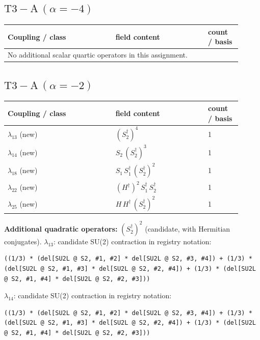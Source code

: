 \documentclass[9pt,a4paper]{article}
\begin{document}
\subsection*{$ \mathrm{T3-A}\,(\alpha=-4) $}
\begin{longtable}{@{}p{0.42\linewidth}p{0.36\linewidth}p{0.13\linewidth}@{}}
\toprule
Coupling / class & field content & count / basis\\
\midrule
\endhead
\multicolumn{3}{l}{No additional scalar quartic operators in this assignment.}\\
\bottomrule
\end{longtable}
\subsection*{$ \mathrm{T3-A}\,(\alpha=-2) $}
\begin{longtable}{@{}p{0.42\linewidth}p{0.36\linewidth}p{0.13\linewidth}@{}}
\toprule
Coupling / class & field content & count / basis\\
\midrule
\endhead
$\lambda_{13}$ (new) & $\left(S_2^\dagger\right)^{4}$ & 1 \\
$\lambda_{14}$ (new) & $S_2\, \left(S_2^\dagger\right)^{3}$ & 1 \\
$\lambda_{18}$ (new) & $S_1\, S_1^\dagger\, \left(S_2^\dagger\right)^{2}$ & 1 \\
$\lambda_{22}$ (new) & $\left(H^\dagger\right)^{2}\, S_1^\dagger\, S_2^\dagger$ & 1 \\
$\lambda_{25}$ (new) & $H\, H^\dagger\, \left(S_2^\dagger\right)^{2}$ & 1 \\
\bottomrule
\end{longtable}
\textbf{Additional quadratic operators:}
$\left(S_2^\dagger\right)^{2}$ (candidate, with Hermitian conjugates).
\textbf{$ \lambda_{13} $}: candidate SU(2) contraction in registry notation:
\begin{lstlisting}[mathescape=true]
((1/3) * (del[SU2L @ S2, #1, #2] * del[SU2L @ S2, #3, #4]) + (1/3) * (del[SU2L @ S2, #1, #3] * del[SU2L @ S2, #2, #4]) + (1/3) * (del[SU2L @ S2, #1, #4] * del[SU2L @ S2, #2, #3]))
\end{lstlisting}

\textbf{$ \lambda_{14} $}: candidate SU(2) contraction in registry notation:
\begin{lstlisting}[mathescape=true]
((1/3) * (del[SU2L @ S2, #1, #2] * del[SU2L @ S2, #3, #4]) + (1/3) * (del[SU2L @ S2, #1, #3] * del[SU2L @ S2, #2, #4]) + (1/3) * (del[SU2L @ S2, #1, #4] * del[SU2L @ S2, #2, #3]))
\end{lstlisting}
\end{document}
